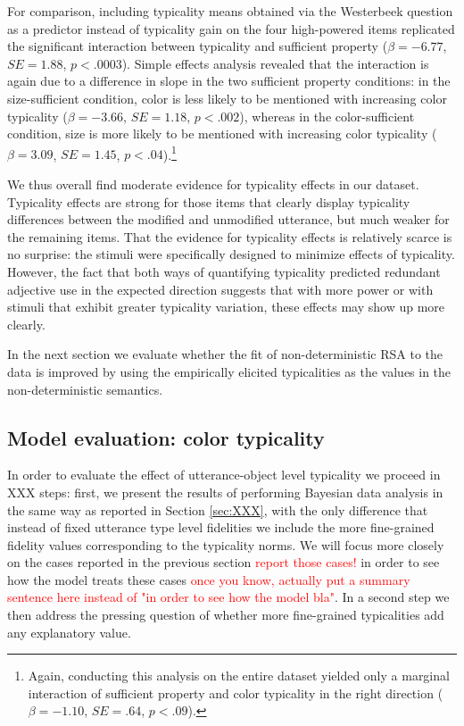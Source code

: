 \documentclass[11pt]{article}
\newcommand{\red}[1]{\textcolor{Red}{#1}}
\newcommand{\sectionref}[1]{Section \ref{#1}}
\begin{document}
For comparison, including typicality means obtained via the Westerbeek question as a predictor instead of typicality gain on the four high-powered items replicated the significant interaction between typicality and sufficient property ($\beta = -6.77$, $SE = 1.88$, $p < .0003$). Simple effects analysis revealed that the interaction is again due to a difference in slope in the two sufficient property conditions: in the size-sufficient condition, color is less likely to be mentioned with increasing color typicality   ($\beta = -3.66$, $SE = 1.18$, $p < .002$), whereas in the color-sufficient condition, size is more likely to be mentioned with increasing color typicality ($\beta = 3.09$, $SE = 1.45$, $p < .04$).\footnote{Again, conducting this analysis on the entire dataset yielded only a marginal interaction of sufficient property and color typicality in the right direction ($\beta = -1.10$, $SE = .64$, $p < .09$).}

We thus overall find moderate evidence for typicality effects in our dataset. Typicality effects are strong for those items that clearly display typicality differences between the modified and unmodified utterance, but much weaker for the remaining items. That the evidence for typicality effects is relatively scarce is no surprise: the stimuli were specifically designed to minimize effects of typicality. However, the fact that both ways of quantifying typicality predicted redundant adjective use in the expected direction suggests that with more power or with stimuli that exhibit greater typicality variation, these effects may show up more clearly.

In the next section we evaluate whether the fit of non-deterministic RSA to the data is improved by using the empirically elicited typicalities as the values in the non-deterministic semantics.

\subsection{Model evaluation: color typicality}
\label{sec:modelevalcolortypicality}

In order to evaluate the effect of utterance-object level typicality we proceed in XXX steps: first, we present the results of performing Bayesian data analysis in the same way as reported in \sectionref{sec:XXX}, with the only difference that instead of fixed utterance type level fidelities we include the more fine-grained fidelity values corresponding to the typicality norms. We will focus more closely on the cases reported in the previous section \red{report those cases!} in order to see how the model treats these cases \red{once you know, actually put a summary sentence here instead of "in order to see how the model bla"}. In a second step we then address the pressing question of whether more fine-grained typicalities add any explanatory value. 
\end{document}
